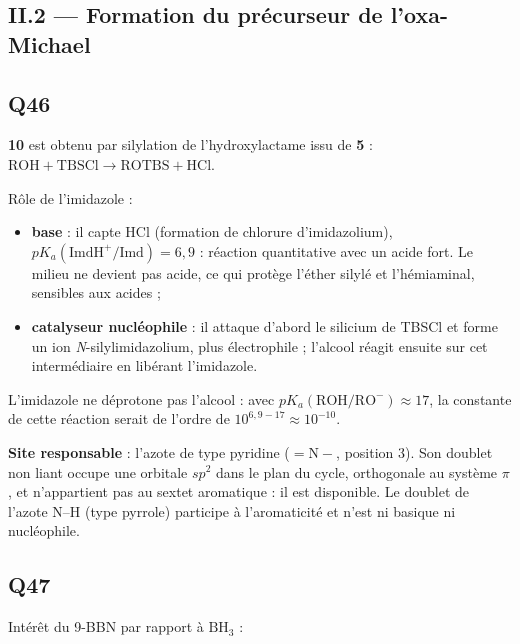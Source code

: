 \documentclass[11pt,a4paper]{article}
\providecommand{\tightlist}{\setlength{\itemsep}{0pt}\setlength{\parskip}{0pt}}
\begin{document}
\hypertarget{ii.2-formation-du-pruxe9curseur-de-loxa-michael}{%
\subsection{II.2 --- Formation du précurseur de l'oxa-Michael}\label{ii.2-formation-du-pruxe9curseur-de-loxa-michael}}

\hypertarget{q46}{%
\subsection{Q46}\label{q46}}

\textbf{10} est obtenu par silylation de l'hydroxylactame issu de \textbf{5} : \(\mathrm{ROH}+\mathrm{TBSCl}\to\mathrm{ROTBS}+\mathrm{HCl}\).

Rôle de l'imidazole :

\begin{itemize}
\tightlist
\item
  \textbf{base} : il capte HCl (formation de chlorure d'imidazolium), \(pK_a(\mathrm{ImdH^+/Imd})=6{,}9\) : réaction quantitative avec un acide fort. Le milieu ne devient pas acide, ce qui protège l'éther silylé et l'hémiaminal, sensibles aux acides ;
\item
  \textbf{catalyseur nucléophile} : il attaque d'abord le silicium de TBSCl et forme un ion \emph{N}-silylimidazolium, plus électrophile ; l'alcool réagit ensuite sur cet intermédiaire en libérant l'imidazole.
\end{itemize}

L'imidazole ne déprotone pas l'alcool : avec \(pK_a(\mathrm{ROH/RO^-})\approx17\), la constante de cette réaction serait de l'ordre de \(10^{6{,}9-17}\approx10^{-10}\).

\textbf{Site responsable} : l'azote de type pyridine (\(\mathrm{{=}N{-}}\), position 3). Son doublet non liant occupe une orbitale \(sp^2\) dans le plan du cycle, orthogonale au système \(\pi\), et n'appartient pas au sextet aromatique : il est disponible. Le doublet de l'azote N--H (type pyrrole) participe à l'aromaticité et n'est ni basique ni nucléophile.

\hypertarget{q47}{%
\subsection{Q47}\label{q47}}

Intérêt du 9-BBN par rapport à \(\mathrm{BH_3}\) :
\end{document}
